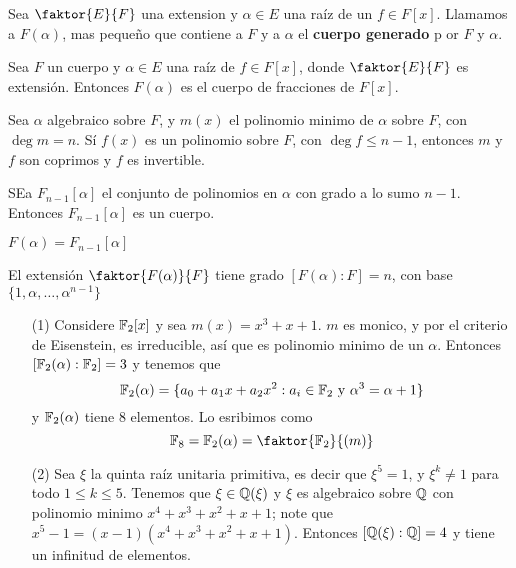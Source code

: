 \begin{definition}
    Sea $\faktor{E}{F}$ una extension y $\alpha \in E$ una ra\'iz de un  $f \in
    F[x]$. Llamamos a $F(\alpha)$, mas peque\~no que contiene a $F$ y a
    $\alpha$ el \textbf{cuerpo generado} p or $F$ y  $\alpha$.
\end{definition}

\begin{lemma}\label{19.81}
    Sea $F$ un cuerpo y  $\alpha \in E$ una ra\'iz de $f \in F[x]$, donde
    $\faktor{E}{F}$ es extensi\'on. Entonces $F(\alpha)$ es el cuerpo de
    fracciones de $F[x]$.
\end{lemma}

\begin{theorem}\label{19.82}
    Sea $\alpha$ algebraico sobre $F$, y $m(x)$ el polinomio minimo de $\alpha$
    sobre  $F$, con  $\deg{m}=n$. S\'i $f(x)$ es un polinomio sobre  $F$, con
    $\deg{f} \leq n-1$, entonces $m$ y  $f$ son coprimos y  $f$ es invertible.
\end{theorem}
\begin{corollary}
    SEa $F_{n-1}[\alpha]$ el conjunto de polinomios en $\alpha$ con grado a lo
    sumo  $n-1$. Entonces  $F_{n-1}[\alpha]$ es un cuerpo.
\end{corollary}
\begin{corollary}
    $F(\alpha)=F_{n-1}[\alpha]$
\end{corollary}
\begin{corollary}
    El extensi\'on $\faktor{F(\alpha)}{F}$ tiene grado $[F(\alpha):F]=n$, con
    base $\{1, \alpha, \dots, \alpha^{n-1}\}$
\end{corollary}

\begin{example}\label{}
    \begin{enumerate}
        \item[(1)] Considere $\mathbb{F}_2[x]$ y sea $m(x)=x^3+x+1$. $m$ es monico, y
            por el criterio de Eisenstein, es irreducible, as\'i que es
            polinomio minimo de un $\alpha$. Entonces $[\mathbb{F}_2(\alpha):\mathbb{F}_2]=3$ y
            tenemos que
            \begin{equation*}
                \mathbb{F}_2(\alpha)=\{a_0+a_1x+a_2x^2 : a_i \in \mathbb{F}_2 \text{ y }
                \alpha^3=\alpha+1\}
            \end{equation*}
            y $\mathbb{F}_2(\alpha)$ tiene $8$ elementos. Lo esribimos como
            \begin{equation*}
                \F_8=\F_2(\alpha)=\faktor{\F_2}{(m)}
            \end{equation*}

        \item[(2)] Sea $\xi$ la quinta ra\'iz unitaria primitiva, es decir que
            $\xi^5=1$, y  $\xi^k \neq 1$ para todo  $1 \leq k \leq 5$. Tenemos
            que $\xi \in \mathbb{Q}(\xi)$ y $\xi$ es algebraico sobre  $\mathbb{Q}$ con
            polinomio minimo $x^4+x^3+x^2+x+1$; note que $x^5-1=(x-1)
            (x^4+x^3+x^2+x+1)$. Entonces $[\mathbb{Q}(\xi):\mathbb{Q}]=4$ y tiene un infinitud
            de elementos.
    \end{enumerate}
\end{example}

